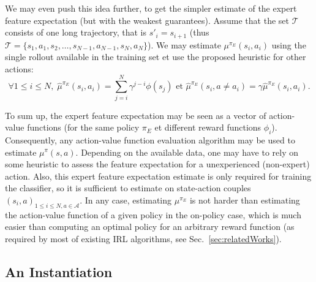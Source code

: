 \documentclass[english,utf8]{./hermes-journal}
\newcommand{\A}{\mathcal{A}}
\newcommand{\T}{\mathcal{T}}
\begin{document}
We may even push this idea further, to get the simpler estimate of
the expert feature expectation (but with the weakest guarantees).
Assume that the set $\T$ consists of one long trajectory, that is
$s'_i = s_{i+1}$ (thus $\T =
\{s_1,a_1,s_2,\dots,s_{N-1},a_{N-1},s_N,a_N\}$). We may estimate
$\mu^{\pi_E}(s_i,a_i)$ using the single rollout available in the
training set et use the proposed heuristic for other actions:
\begin{equation}
  \forall 1\leq i \leq N,\; \hat{\mu}^{\pi_E}(s_i,a_i) =
  \sum_{j=i}^N \gamma^{j-i}\phi(s_j) \text{ et }
  \hat{\mu}^{\pi_E}(s_i,a\neq a_i) = \gamma
  \hat{\mu}^{\pi_E}(s_i,a_i).
  \label{eq:mc_plus_heuristic}
\end{equation}

To sum up, the expert feature expectation may be seen as a vector of
action-value functions (for the same policy $\pi_E$ et different
reward functions $\phi_i$). Consequently, any action-value function
evaluation algorithm may be used to estimate $\mu^\pi(s,a)$.
Depending on the available data, one may have to rely on some
heuristic to assess the feature expectation for a unexperienced
(non-expert) action. Also, this expert feature expectation estimate
is only required for training the classifier, so it is sufficient to
estimate on state-action couples $(s_i,a)_{1\leq i \leq N,a\in \A}$.
In any case, estimating $\mu^{\pi_E}$ is not harder than estimating
the action-value function of a given policy in the on-policy case,
which is much easier than computing an optimal policy for an
arbitrary reward function (as required by most of existing IRL
algorithms, see Sec.~\ref{sec:relatedWorks}).


\subsection{An Instantiation}
\label{subsec:practicalApproach:instantiation}
\end{document}

